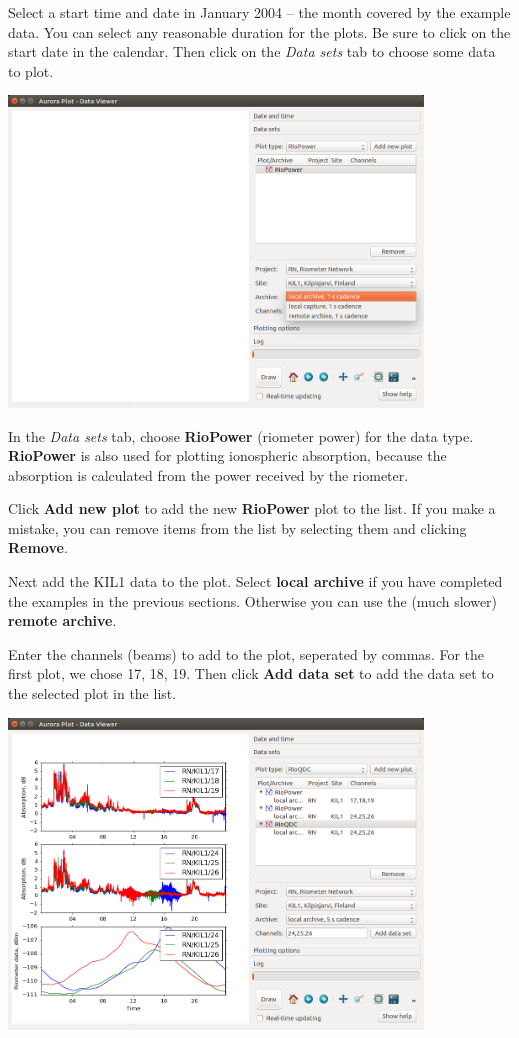 \documentclass{article}
\begin{document}
Select a start time and date in January 2004 -- the month covered by the example data. You can select any reasonable duration for the plots.
Be sure to click on the start date in the calendar. Then click on the {\it Data sets} tab to choose some data to plot.

\begin{center}
\includegraphics[width=11cm]{images/dv-2.png}
\end{center}

\noindent In the {\it Data sets} tab, choose {\bf RioPower} (riometer power) for the data type. {\bf RioPower} is also used for plotting ionospheric absorption, because the absorption is calculated from the power received by the riometer.

Click {\bf Add new plot} to add the new {\bf RioPower} plot to the list.
If you make a mistake, you can remove items from the list by selecting them and clicking {\bf Remove}.

Next add the KIL1 data to the plot. Select {\bf local archive} if you have completed the examples in the previous sections. Otherwise you can use the (much slower) {\bf remote archive}.

Enter the channels (beams) to add to the plot, seperated by commas. For the first plot, we chose 17, 18, 19. Then click {\bf Add data set} to add the data set to the selected plot in the list.

\begin{center}
\includegraphics[width=11cm]{images/dv-3.png}
\end{center}
\end{document}
